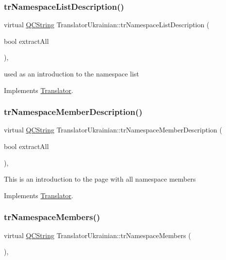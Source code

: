 \subsubsection{\texorpdfstring{trNamespaceListDescription()}{trNamespaceListDescription()}}
{\footnotesize\ttfamily virtual \mbox{\hyperlink{class_q_c_string}{Q\+C\+String}} Translator\+Ukrainian\+::tr\+Namespace\+List\+Description (\begin{DoxyParamCaption}\item[{bool}]{extract\+All }\end{DoxyParamCaption})\hspace{0.3cm}{\ttfamily [inline]}, {\ttfamily [virtual]}}

used as an introduction to the namespace list 

Implements \mbox{\hyperlink{class_translator}{Translator}}.

\mbox{\label{class_translator_ukrainian_ac522131f0b195d0eec0e324fe0154702}} 
\subsubsection{\texorpdfstring{trNamespaceMemberDescription()}{trNamespaceMemberDescription()}}
{\footnotesize\ttfamily virtual \mbox{\hyperlink{class_q_c_string}{Q\+C\+String}} Translator\+Ukrainian\+::tr\+Namespace\+Member\+Description (\begin{DoxyParamCaption}\item[{bool}]{extract\+All }\end{DoxyParamCaption})\hspace{0.3cm}{\ttfamily [inline]}, {\ttfamily [virtual]}}

This is an introduction to the page with all namespace members 

Implements \mbox{\hyperlink{class_translator}{Translator}}.

\mbox{\label{class_translator_ukrainian_a68267caf64d35ad694b0dc3570ff2f80}} 
\subsubsection{\texorpdfstring{trNamespaceMembers()}{trNamespaceMembers()}}
{\footnotesize\ttfamily virtual \mbox{\hyperlink{class_q_c_string}{Q\+C\+String}} Translator\+Ukrainian\+::tr\+Namespace\+Members (\begin{DoxyParamCaption}{ }\end{DoxyParamCaption})\hspace{0.3cm}{\ttfamily [inline]}, {\ttfamily [virtual]}}

